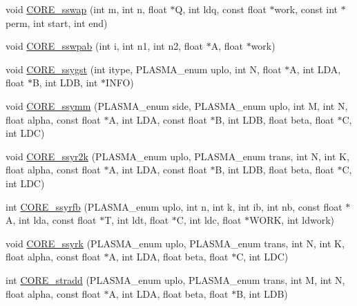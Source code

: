 \begin{DoxyCompactItemize}
\item 
void \hyperlink{group__CORE__float_ga232efb8ed331f9cf771265d60355616b_ga232efb8ed331f9cf771265d60355616b}{C\+O\+R\+E\+\_\+sswap} (int m, int n, float $\ast$Q, int ldq, const float $\ast$work, const int $\ast$perm, int start, int end)
\item 
void \hyperlink{group__CORE__float_ga28d76e29d71bc1baa9e8d5d11a2ef567_ga28d76e29d71bc1baa9e8d5d11a2ef567}{C\+O\+R\+E\+\_\+sswpab} (int i, int n1, int n2, float $\ast$A, float $\ast$work)
\item 
void \hyperlink{group__CORE__float_ga056a124ceba448a80ddd3bc688be99b9_ga056a124ceba448a80ddd3bc688be99b9}{C\+O\+R\+E\+\_\+ssygst} (int itype, P\+L\+A\+S\+M\+A\+\_\+enum uplo, int N, float $\ast$A, int L\+D\+A, float $\ast$B, int L\+D\+B, int $\ast$I\+N\+F\+O)
\item 
void \hyperlink{group__CORE__float_gae8418dd41708f6cdc2a7bfdade9846ac_gae8418dd41708f6cdc2a7bfdade9846ac}{C\+O\+R\+E\+\_\+ssymm} (P\+L\+A\+S\+M\+A\+\_\+enum side, P\+L\+A\+S\+M\+A\+\_\+enum uplo, int M, int N, float alpha, const float $\ast$A, int L\+D\+A, const float $\ast$B, int L\+D\+B, float beta, float $\ast$C, int L\+D\+C)
\item 
void \hyperlink{group__CORE__float_gac899db27fcbd93e712c976d0ea246ec2_gac899db27fcbd93e712c976d0ea246ec2}{C\+O\+R\+E\+\_\+ssyr2k} (P\+L\+A\+S\+M\+A\+\_\+enum uplo, P\+L\+A\+S\+M\+A\+\_\+enum trans, int N, int K, float alpha, const float $\ast$A, int L\+D\+A, const float $\ast$B, int L\+D\+B, float beta, float $\ast$C, int L\+D\+C)
\item 
int \hyperlink{group__CORE__float_ga92382b0c18c55c5e9f530dd1e3f5206c_ga92382b0c18c55c5e9f530dd1e3f5206c}{C\+O\+R\+E\+\_\+ssyrfb} (P\+L\+A\+S\+M\+A\+\_\+enum uplo, int n, int k, int ib, int nb, const float $\ast$A, int lda, const float $\ast$T, int ldt, float $\ast$C, int ldc, float $\ast$W\+O\+R\+K, int ldwork)
\item 
void \hyperlink{group__CORE__float_gabfbe3de49ef7f0e02708cad646b11d5e_gabfbe3de49ef7f0e02708cad646b11d5e}{C\+O\+R\+E\+\_\+ssyrk} (P\+L\+A\+S\+M\+A\+\_\+enum uplo, P\+L\+A\+S\+M\+A\+\_\+enum trans, int N, int K, float alpha, const float $\ast$A, int L\+D\+A, float beta, float $\ast$C, int L\+D\+C)
\item 
int \hyperlink{group__CORE__float_ga0b2749e0094b75546cea60400eb7a20d_ga0b2749e0094b75546cea60400eb7a20d}{C\+O\+R\+E\+\_\+stradd} (P\+L\+A\+S\+M\+A\+\_\+enum uplo, P\+L\+A\+S\+M\+A\+\_\+enum trans, int M, int N, float alpha, const float $\ast$A, int L\+D\+A, float beta, float $\ast$B, int L\+D\+B)

\end{DoxyCompactItemize}

